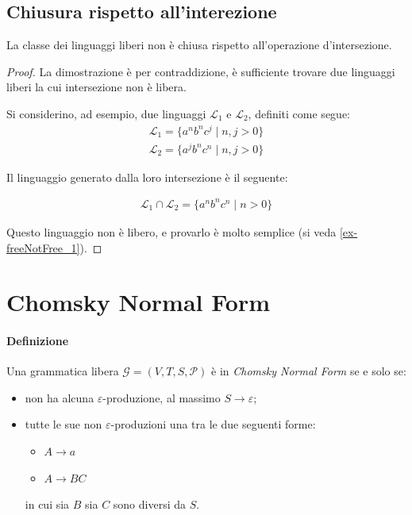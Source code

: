 \documentclass[class=book, crop=false, oneside, 12pt]{standalone}
\begin{document}
\subsection*{Chiusura rispetto all'interezione}

\begin{lemma}
  La classe dei linguaggi liberi non è chiusa rispetto all'operazione d'intersezione.
\end{lemma}

\begin{proof}
  La dimostrazione è per contraddizione, è sufficiente trovare due linguaggi liberi la cui intersezione non è libera.

  Si considerino, ad esempio, due linguaggi \(\mathcal{L}_1\) e \(\mathcal{L}_2\), definiti come segue:
  \begin{align*}
      \mathcal{L}_1 = \{a^n b^n c^j \mid n, j > 0 \} \\
      \mathcal{L}_2 = \{a^j b^n c^n \mid n, j > 0 \}
  \end{align*}

  \noindent Il linguaggio generato dalla loro intersezione è il seguente:

  \begin{align*}
    \mathcal{L}_1 \cap \mathcal{L}_2 = \{ a^n b^n c^n \mid n > 0 \}
  \end{align*}

  \noindent Questo linguaggio non è libero, e provarlo è molto semplice (si veda \ref{ex-freeNotFree_1}).

\end{proof}

\section{Chomsky Normal Form}
\paragraph{Definizione}
Una grammatica libera \(\mathcal{G} = (V, T, S, \mathcal{P})\) è in \emph{Chomsky Normal Form} se e solo se:
\begin{itemize}
  \item non ha alcuna \(\varepsilon\)-produzione, al massimo \(S \rightarrow \varepsilon\);
  \item tutte le sue non \(\varepsilon\)-produzioni  una tra le due seguenti forme:
  \begin{itemize}
    \item \(A \rightarrow a\)
    \item \(A \rightarrow BC\)
  \end{itemize}
  in cui sia \(B\) sia \(C\) sono diversi da \(S\).
\end{itemize}
\end{document}
